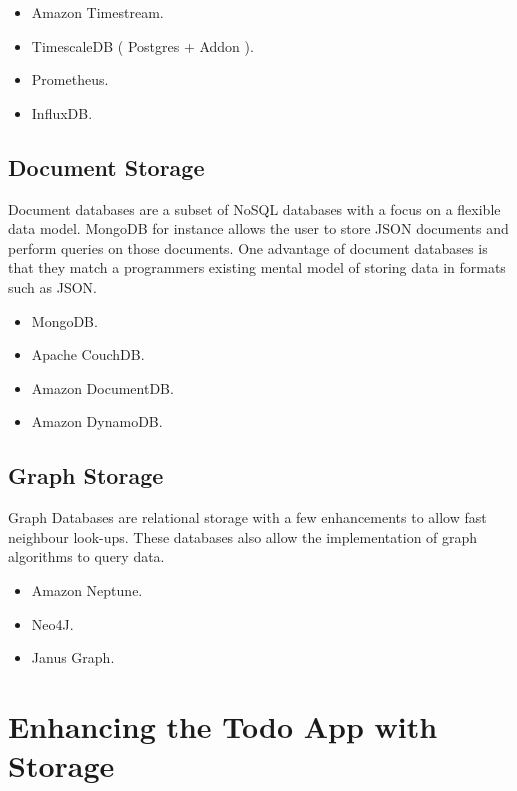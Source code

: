 \documentclass{csse4400}
\begin{document}
\begin{itemize}
  \item Amazon Timestream.
  \item TimescaleDB ( Postgres + Addon ).
  \item Prometheus.
  \item InfluxDB.
\end{itemize}

\subsection{Document Storage}

Document databases are a subset of NoSQL databases with a focus on a flexible data model.
MongoDB for instance allows the user to store JSON documents and perform queries on those documents.
One advantage of document databases is that they match a programmers existing mental model of storing data in formats such as JSON.

\begin{itemize}
  \item MongoDB.
  \item Apache CouchDB.
  \item Amazon DocumentDB.
  \item Amazon DynamoDB.
\end{itemize}

\subsection{Graph Storage}


Graph Databases are relational storage with a few enhancements to allow fast neighbour look-ups.
These databases also allow the implementation of graph algorithms to query data.

\begin{itemize}
  \item Amazon Neptune.
  \item Neo4J.
  \item Janus Graph.
\end{itemize}

\section{Enhancing the Todo App with Storage}
\end{document}
